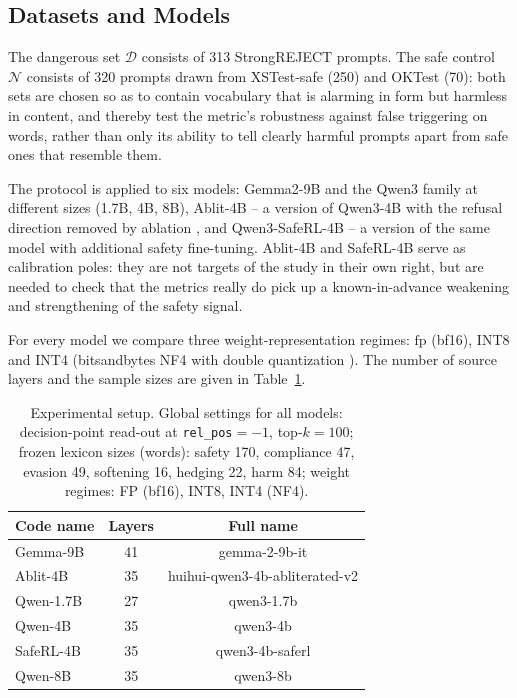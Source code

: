 \documentclass[10pt,twocolumn]{article}
\newcommand{\Dset}{\mathcal{D}}
\newcommand{\Nset}{\mathcal{N}}
\newcommand{\fp}{\mathrm{fp}}
\begin{document}
\subsection{Datasets and Models}

The dangerous set $\Dset$ consists of 313 StrongREJECT prompts. The safe control $\Nset$ consists of 320 prompts drawn from XSTest-safe (250) and OKTest (70): both sets are chosen so as to contain vocabulary that is alarming in form but harmless in content, and thereby test the metric's robustness against false triggering on words, rather than only its ability to tell clearly harmful prompts apart from safe ones that resemble them.

The protocol is applied to six models: Gemma2-9B \citep{gemmateam2024gemma2} and the Qwen3 family at different sizes (1.7B, 4B, 8B), Ablit-4B --
a version of Qwen3-4B with the refusal direction removed by ablation \citep{arditi2024refusal}, and Qwen3-SafeRL-4B -- a version
of the same model with additional safety fine-tuning. Ablit-4B and SafeRL-4B serve as calibration poles: they are not targets of the study in their own right, but are needed to check that the metrics really do pick up a known-in-advance weakening and strengthening of the safety signal.

For every model we compare three
weight-representation regimes: $\fp$ (bf16), INT8 \citep{dettmers2022llmint8} and INT4
(bitsandbytes NF4 with double quantization \citep{dettmers2023qlora}). The number of source layers and the
sample sizes are given in Table~\ref{tab:setup}.

\begin{table}[htbp]
\centering\small
\caption{Experimental setup. Global settings for all models: decision-point read-out at
\texttt{rel\_pos}$=-1$, top-$k=100$; frozen lexicon sizes (words): safety 170, compliance
47, evasion 49, softening 16, hedging 22, harm 84; weight regimes: FP (bf16), INT8, INT4 (NF4).}
\label{tab:setup}
\begin{tabular}{@{}lcc@{}}
\toprule
Code name & Layers & Full name \\
\midrule
Gemma-9B  & 41 & gemma-2-9b-it \\
Ablit-4B  & 35 & huihui-qwen3-4b-abliterated-v2 \\
Qwen-1.7B & 27 & qwen3-1.7b \\
Qwen-4B   & 35 & qwen3-4b \\
SafeRL-4B & 35 & qwen3-4b-saferl \\
Qwen-8B   & 35 & qwen3-8b \\
\bottomrule
\end{tabular}
\end{table}
\end{document}
